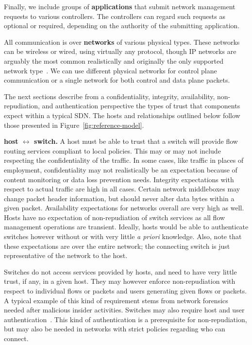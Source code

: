 \documentclass[10pt,conference]{IEEEtran}
\begin{document}
Finally, we include groups of {\bf applications} that submit network management requests to various controllers.  The controllers can regard such requests as optional or required, depending on the authority of the submitting application.

All communication is over {\bf networks} of various physical types.  These networks can be wireless or wired, using virtually any protocol, though IP networks are arguably the most common realistically and originally the only supported network type~\cite{openflow1.0}.  We can use different physical networks for control plane communication or a single network for both control and data plane packets.

The next sections describe from a confidentiality, integrity, availability, non-repudiation, and authentication perspective the types of trust that components expect within a typical SDN.  The hosts and relationships outlined below follow those presented in Figure~\ref{fig:reference-model}.

\noindent
{\bf host $\leftrightarrow$ switch.} A host must be able to trust that a switch will provide flow routing services compliant to local policies.  This may or may not include respecting the confidentiality of the traffic. In some cases, like traffic in places of employment, confidentiality may not realistically be an expectation because of content monitoring or data loss prevention needs.  Integrity expectations with respect to actual traffic are high in all cases.  Certain network middleboxes may change packet header information, but should never alter data bytes within a given packet.  Availability expectations for networks overall are very high as well.  Hosts have no expectation of non-repudiation of switch services as all flow management operations are transient.  Ideally, hosts would be able to authenticate switches however without or with very little {\sl a priori} knowledge.  Also, note that these expectations are over the entire network; the connecting switch is just representative of the network to the host.

Switches do not access services provided by hosts, and need to have very little trust, if any, in a given host.  They may however enforce non-repudiation with respect to individual flows or packets and users generating given flows or packets.  A typical example of this kind of requirement stems from network forensics needed after malicious insider activities. Switches may also require host and user authentication~\cite{CaFrPeLu:07}.  This kind of authentication is a prerequisite for non-repudiation, but may also be needed in networks with strict policies regarding who can connect.
\end{document}

